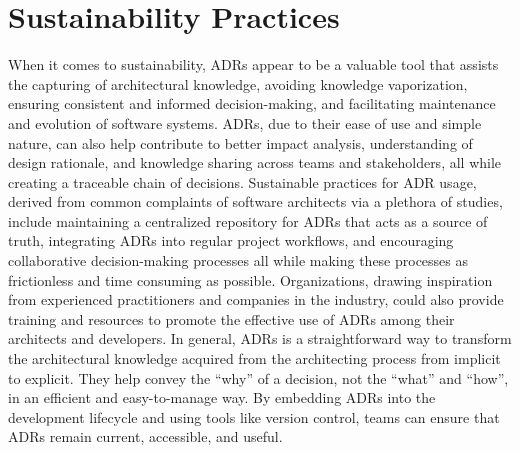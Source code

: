     \section{Sustainability Practices}
        When it comes to sustainability, ADRs appear to be a valuable tool that assists the capturing of architectural knowledge, avoiding knowledge vaporization, ensuring consistent and informed decision-making, and facilitating maintenance and evolution of software systems. ADRs, due to their ease of use and simple nature, can also help contribute to better impact analysis, understanding of design rationale, and knowledge sharing across teams and stakeholders, all while creating a traceable chain of decisions. Sustainable practices for ADR usage, derived from common complaints of software architects via a plethora of studies, include maintaining a centralized repository for ADRs that acts as a source of truth, integrating ADRs into regular project workflows, and encouraging collaborative decision-making processes all while making these processes as frictionless and time consuming as possible. Organizations, drawing inspiration from experienced practitioners and companies in the industry, could also provide training and resources to promote the effective use of ADRs among their architects and developers. In general, ADRs is a straightforward way to transform the architectural knowledge acquired from the architecting process from implicit to explicit. They help convey the ``why'' of a decision, not the ``what'' and ``how'', in an efficient and easy-to-manage way. By embedding ADRs into the development lifecycle and using tools like version control, teams can ensure that ADRs remain current, accessible, and useful. 
